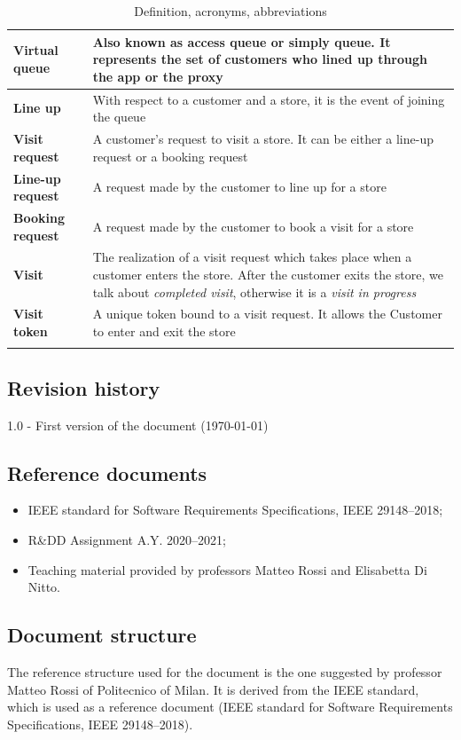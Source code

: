 \documentclass[a4paper,oneside,11pt]{book}   %
\begin{document}
\begin{longtable}[c] { |>{\bfseries{}}C{0.25\textwidth}|H{0.55\textwidth}| }
        Virtual queue & Also known as access queue or simply queue. It represents the set of customers who lined up through the app or the proxy \\ \hline
        Line up & With respect to a customer and a store, it is the event of joining the queue \\ \hline
        Visit request & A customer’s request to visit a store. It can be either a line-up request or a booking request \\ \hline
        Line-up request & A request made by the customer  to line up for a store \\ \hline
        Booking request & A request made by the customer  to book a visit for a store \\ \hline 
        Visit & The realization of a visit request which takes place when a customer enters the store. After the customer exits the store, we talk about \textit{completed visit}, otherwise it is a \textit{visit in progress} \\ \hline
        Visit token & A unique token bound to a visit request. It allows the Customer to enter and exit the store \\
        \hline
    \caption{Definition, acronyms, abbreviations}
    \label{table:definitions_acronyms_abbreviations}
    \end{longtable} %
    
    \subsection{Revision history}
    1.0 - First version of the document (\today)
    
    \subsection{Reference documents}
    \begin{itemize}
        \item IEEE standard for Software Requirements Specifications, IEEE 29148--2018;
        \item R\&DD Assignment A.Y. 2020--2021;
        \item Teaching material provided by professors Matteo Rossi and Elisabetta Di Nitto.
    \end{itemize}

    \subsection{Document structure}
    The reference structure used for the document is the one suggested by professor Matteo Rossi of Politecnico of Milan. It is derived from the IEEE standard, which is used as a reference document (IEEE standard for Software Requirements Specifications, IEEE 29148--2018).
    
\end{document}
